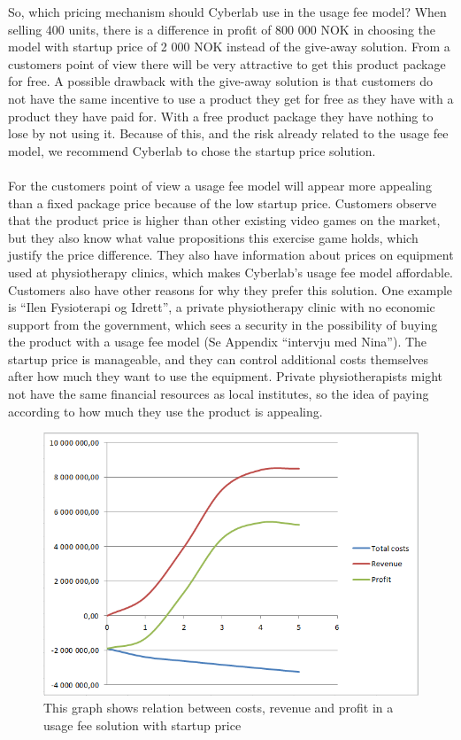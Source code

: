 So, which pricing mechanism should Cyberlab use in the usage fee model? When selling 400 units, there is a difference in profit of 800 000 NOK in choosing the model with startup price of 2 000 NOK instead of the give-away solution. From a customers point of view there will be very attractive to get this product package for free. A possible drawback with the give-away solution is that customers do not have the same incentive to use a product they get for free as they have with a product they have paid for. With a free product package they have nothing to lose by not using it. Because of this, and the risk already related to the usage fee model, we recommend Cyberlab to chose the startup price solution. \\ \\ 
For the customers point of view a usage fee model will appear more appealing than a fixed package price because of the low startup price. Customers observe that the product price is higher than other existing video games on the market, but they also know what value propositions this exercise game holds, which justify the price difference. They also have information about prices on equipment used at physiotherapy clinics, which makes Cyberlab’s usage fee model affordable. Customers also have other reasons for why they prefer this solution. One example is “Ilen Fysioterapi og Idrett”, a private physiotherapy clinic with no economic support from the government, which sees a security in the possibility of buying the product with a usage fee model (Se Appendix “intervju med Nina”). The startup price is manageable, and they can control additional costs themselves after how much they want to use the equipment. Private physiotherapists might not have the same financial resources as local institutes, so the idea of paying according to how much they use the product is appealing. 
\begin{figure}
\begin{center}
\includegraphics[scale=0.8]{profitusagefee}
\caption[Profit, Revenue and Cost for a Usage Fee Solution]{This graph shows relation between costs, revenue and profit in a usage fee solution with startup price}
\label{fig:ProfitUsageFee}
\end{center}
\end{figure}